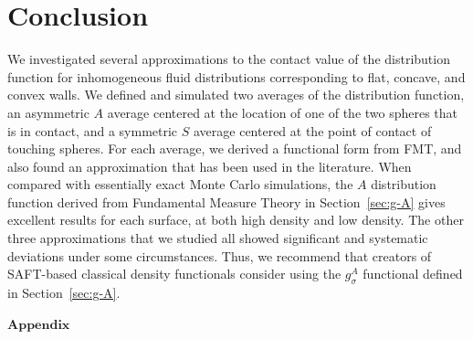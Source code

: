 \section{Conclusion}
We investigated several approximations to the contact value of the
distribution function for inhomogeneous fluid distributions
corresponding to flat, concave, and convex walls.  We
defined and simulated two averages of the distribution function, an
asymmetric $A$ average centered at the location of one of the two
spheres that is in contact, and a symmetric $S$ average centered at
the point of contact of touching spheres.  For each average, we
derived a functional form from FMT, and also found an approximation
that has been used in the literature.  When compared with essentially
exact Monte Carlo simulations, the $A$ distribution function derived
from Fundamental Measure Theory in Section~\ref{sec:g-A} gives
excellent results for each surface, at both high density and low
density.  The other three approximations that we studied all showed
significant and systematic deviations under some circumstances.  Thus,
we recommend that creators of SAFT-based classical density functionals
consider using the $g_\sigma^A$ functional defined in
Section~\ref{sec:g-A}.





$\mathbf{Appendix}$

